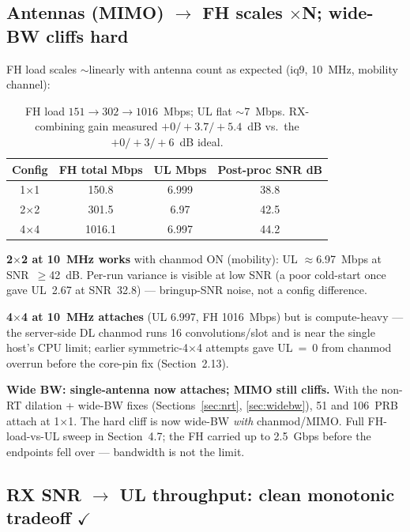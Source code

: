 \documentclass[11pt,a4paper]{article}
\newcommand{\yes}{\textcolor{closedcol}{\ensuremath{\checkmark}}}
\begin{document}
\subsection{Antennas (MIMO) $\rightarrow$ FH scales $\times$N; wide-BW cliffs hard}

FH load scales $\sim$linearly with antenna count as expected
(iq9, 10~MHz, mobility channel):

\begin{table}[h]\centering\small
\begin{tabular}{@{}c c c c@{}}
\toprule
\textbf{Config} & \textbf{FH total Mbps} & \textbf{UL Mbps} & \textbf{Post-proc SNR dB} \\
\midrule
1$\times$1 & 150.8  & 6.999 & 38.8 \\
2$\times$2 & 301.5  & 6.97  & 42.5 \\
4$\times$4 & 1016.1 & 6.997 & 44.2 \\
\bottomrule
\end{tabular}
\caption*{\small FH load $151 \rightarrow 302 \rightarrow 1016$~Mbps; UL flat $\sim$7~Mbps.
RX-combining gain measured $+0/+3.7/+5.4$~dB vs.\ the $+0/+3/+6$~dB ideal.}
\end{table}

\textbf{2$\times$2 at 10~MHz works} with chanmod ON (mobility): UL $\approx$6.97~Mbps at
SNR~$\geq$42~dB. Per-run variance is visible at low SNR (a poor cold-start once gave UL~2.67 at
SNR~32.8) --- bringup-SNR noise, not a config difference.

\textbf{4$\times$4 at 10~MHz attaches} (UL 6.997, FH 1016~Mbps) but is compute-heavy --- the
server-side DL chanmod runs 16 convolutions/slot and is near the single host's CPU limit;
earlier symmetric-4$\times$4 attempts gave UL~=~0 from chanmod overrun before the core-pin fix
(Section~2.13).

\textbf{Wide BW: single-antenna now attaches; MIMO still cliffs.} With the non-RT dilation +
wide-BW fixes (Sections~\ref{sec:nrt}, \ref{sec:widebw}), 51 and 106~PRB attach at 1$\times$1.
The hard cliff is now wide-BW \emph{with} chanmod/MIMO. Full FH-load-vs-UL sweep in
Section~4.7; the FH carried up to 2.5~Gbps before the endpoints fell over --- bandwidth is not
the limit.

\subsection{RX SNR $\rightarrow$ UL throughput: clean monotonic tradeoff
  \texorpdfstring{\yes}{[OK]}}
\end{document}

